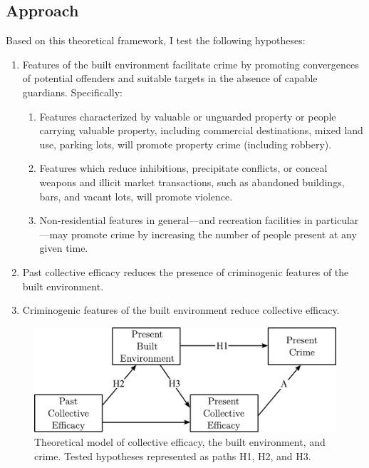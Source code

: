 \documentclass [11pt, proquest] {uwthesis}[2015/03/03]
\providecommand{\tightlist}{%
  \setlength{\itemsep}{0pt}\setlength{\parskip}{0pt}}
\begin{document}
\hypertarget{approach}{%
\subsection{Approach}\label{approach}}

Based on this theoretical framework, I test the following hypotheses:
\begin{enumerate}
\def\labelenumi{\arabic{enumi}.}
\tightlist
\item
  Features of the built environment facilitate crime by promoting convergences of potential offenders and suitable targets in the absence of capable guardians. Specifically:
  \begin{enumerate}
  \def\labelenumii{\alph{enumii}.}
  \tightlist
  \item
    Features characterized by valuable or unguarded property or people carrying valuable property, including commercial destinations, mixed land use, parking lots, will promote property crime (including robbery).
  \item
    Features which reduce inhibitions, precipitate conflicts, or conceal weapons and illicit market transactions, such as abandoned buildings, bars, and vacant lots, will promote violence.
  \item
    Non-residential features in general---and recreation facilities in particular---may promote crime by increasing the number of people present at any given time.
  \end{enumerate}
\item
  Past collective efficacy reduces the presence of criminogenic features of the built environment.
\item
  Criminogenic features of the built environment reduce collective efficacy.
\end{enumerate}
\begin{figure}
\includegraphics[width=1\linewidth]{./figure/ch2/basic_model} \caption[Theoretical model of collective efficacy, the built environment, and crime.]{Theoretical model of collective efficacy, the built environment, and crime. Tested hypotheses represented as paths H1, H2, and H3.}\label{fig:basicmodel}
\end{figure}
\end{document}
